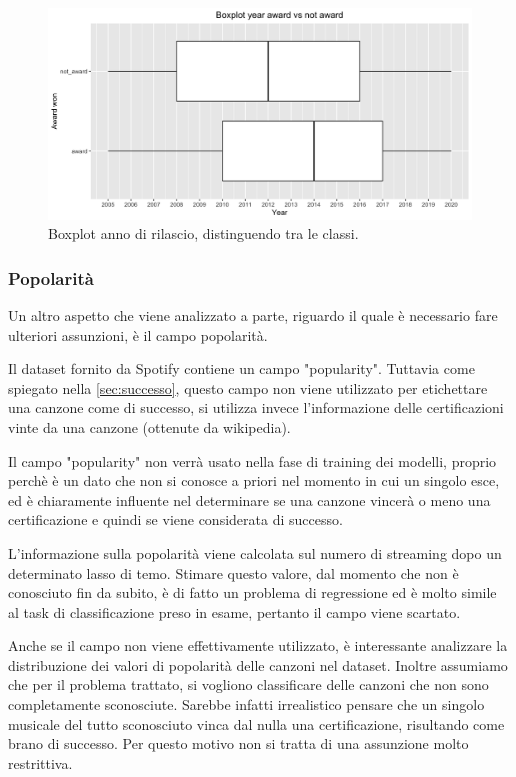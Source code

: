  \begin{figure}[H]
 	\centering
 	\includegraphics[width=13cm]{../images/year_award_comparison.png}
 	\caption{Boxplot anno di rilascio, distinguendo tra le classi.}
 	\label{fig:year_boxplot_award}
 \end{figure}
 
\subsubsection{Popolarità}
\label{sec:popularity}
Un altro aspetto che viene analizzato a parte, riguardo il quale è
necessario fare ulteriori assunzioni, è il campo popolarità.

Il dataset fornito da Spotify contiene un campo "popularity". Tuttavia
come spiegato nella \autoref{sec:successo}, questo campo non viene
utilizzato per etichettare una canzone come di successo, si utilizza
invece l'informazione delle certificazioni vinte da una canzone
(ottenute da wikipedia).

Il campo "popularity" non verrà usato nella fase di training dei
modelli, proprio perchè è un dato che non si conosce a priori nel
momento in cui un singolo esce, ed è chiaramente influente nel
determinare se una canzone vincerà o meno una certificazione e quindi
se viene considerata di successo.

L'informazione sulla popolarità viene calcolata sul numero di
streaming dopo un determinato lasso di temo. Stimare questo valore,
dal momento che non è conosciuto fin da subito, è di fatto un problema
di regressione ed è molto simile al task di classificazione preso in
esame, pertanto il campo viene scartato.

Anche se il campo non viene effettivamente utilizzato, è interessante
analizzare la distribuzione dei valori di popolarità delle canzoni nel
dataset. Inoltre assumiamo che per il problema trattato, si vogliono
classificare delle canzoni che non sono completamente
sconosciute. Sarebbe infatti irrealistico pensare che un singolo
musicale del tutto sconosciuto vinca dal nulla una certificazione,
risultando come brano di successo.  Per questo motivo non si tratta di
una assunzione molto restrittiva.

